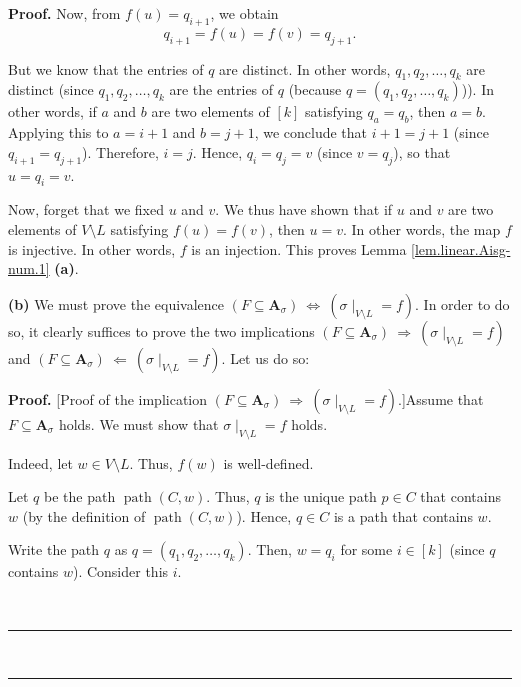 \documentclass[numbers=enddot,12pt,final,onecolumn,notitlepage]{scrartcl}%
\numberwithin{exer}{section}
\theoremstyle{definition}
\newenvironment{proof}[1][Proof]{\noindent\textbf{#1.} }{\ \rule{0.5em}{0.5em}}
\newenvironment{verlong}{}{}
\begin{document}
\begin{verlong}
\begin{proof}
Now, from $f\left(  u\right)  =q_{i+1}$, we obtain%
\[
q_{i+1}=f\left(  u\right)  =f\left(  v\right)  =q_{j+1}.
\]


But we know that the entries of $q$ are distinct. In other words, $q_{1}%
,q_{2},\ldots,q_{k}$ are distinct (since $q_{1},q_{2},\ldots,q_{k}$ are the
entries of $q$ (because $q=\left(  q_{1},q_{2},\ldots,q_{k}\right)  $)). In
other words, if $a$ and $b$ are two elements of $\left[  k\right]  $
satisfying $q_{a}=q_{b}$, then $a=b$. Applying this to $a=i+1$ and $b=j+1$, we
conclude that $i+1=j+1$ (since $q_{i+1}=q_{j+1}$). Therefore, $i=j$. Hence,
$q_{i}=q_{j}=v$ (since $v=q_{j}$), so that $u=q_{i}=v$.

Now, forget that we fixed $u$ and $v$. We thus have shown that if $u$ and $v$
are two elements of $V\setminus L$ satisfying $f\left(  u\right)  =f\left(
v\right)  $, then $u=v$. In other words, the map $f$ is injective. In other
words, $f$ is an injection. This proves Lemma \ref{lem.linear.Aisg-num.1}
\textbf{(a)}. \medskip

\textbf{(b)} We must prove the equivalence $\left(  F\subseteq\mathbf{A}%
_{\sigma}\right)  \ \Longleftrightarrow\ \left(  \left.  \sigma\mid
_{V\setminus L}\right.  =f\right)  $. In order to do so, it clearly suffices
to prove the two implications $\left(  F\subseteq\mathbf{A}_{\sigma}\right)
\ \Longrightarrow\ \left(  \left.  \sigma\mid_{V\setminus L}\right.
=f\right)  $ and $\left(  F\subseteq\mathbf{A}_{\sigma}\right)
\ \Longleftarrow\ \left(  \left.  \sigma\mid_{V\setminus L}\right.  =f\right)
$. Let us do so:

\begin{proof}
[Proof of the implication $\left(  F\subseteq\mathbf{A}_{\sigma}\right)
\ \Longrightarrow\ \left(  \left.  \sigma\mid_{V\setminus L}\right.
=f\right)  $.]Assume that $F\subseteq\mathbf{A}_{\sigma}$ holds. We must show
that $\left.  \sigma\mid_{V\setminus L}\right.  =f$ holds.

Indeed, let $w\in V\setminus L$. Thus, $f\left(  w\right)  $ is well-defined.

Let $q$ be the path $\operatorname*{path}\left(  C,w\right)  $. Thus, $q$ is
the unique path $p\in C$ that contains $w$ (by the definition of
$\operatorname*{path}\left(  C,w\right)  $). Hence, $q\in C$ is a path that
contains $w$.

Write the path $q$ as $q=\left(  q_{1},q_{2},\ldots,q_{k}\right)  $. Then,
$w=q_{i}$ for some $i\in\left[  k\right]  $ (since $q$ contains $w$). Consider
this $i$.


\end{proof}
\end{proof}
\end{verlong}
\end{document}
